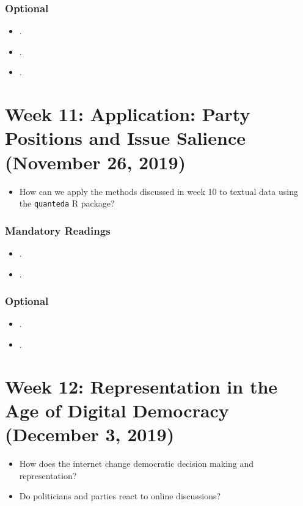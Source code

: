 \documentclass[abstract=on,parskip=full,headings=standardclasses,fontsize=11pt,paper=a4]{scrartcl}
\begin{document}
\subsubsection*{Optional}
\begin{itemize}
\item {}.
\item {}.
\item {}.
\end{itemize}


\section{Week 11:  Application: Party Positions and Issue Salience (November 26, 2019)}

\begin{itemize}
\renewcommand\labelitemi{--}
\item How can we apply the methods discussed in week 10 to textual data using the \texttt{quanteda} \textsf{R} package?
\end{itemize}

\subsubsection*{Mandatory Readings}
\begin{itemize}
\item {}.
\item {}.
\end{itemize}


\subsubsection*{Optional}
\begin{itemize}
\item {}.
\item {}.
\end{itemize}





\section{Week 12: Representation in the Age of Digital Democracy (December 3, 2019)}


\begin{itemize}
\renewcommand\labelitemi{--}
\item How does the internet change democratic decision making and representation?
\item Do politicians and parties react to online discussions?
\end{itemize}
\end{document}
